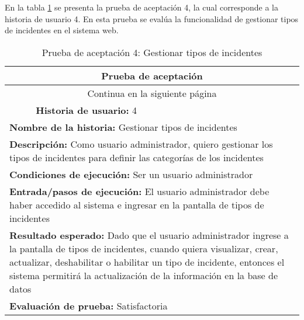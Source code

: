 En la tabla \ref{tab:prueba-4} se presenta la prueba de aceptación 4, la cual corresponde a la historia de usuario 4.
En esta prueba se evalúa la funcionalidad de gestionar tipos de incidentes en el sistema web.

\begin{longtable}{|p{6.7cm}|p{6.7cm}|}
    \caption{Prueba de aceptación 4: Gestionar tipos de incidentes} \label{tab:prueba-4}
    \\
    \hline
    \multicolumn{2}{|c|}{\textbf{Prueba de aceptación}}                                                                                                                         \\
    \hline

    \endfirsthead

    \hline
    \endhead

    \hline
    \multicolumn{2}{|c|}{{Continua en la siguiente página}}                                                                                                                     \\
    \hline
    \endfoot

    \hline
    \endlastfoot
    \multicolumn{1}{|p{6.7cm}|}{\textbf{Número} 4 } & \multicolumn{1}{|p{6.7cm}|}{\textbf{Historia de usuario:} 4}                                                              \\
    \hline
    \multicolumn{2}{|p{13.4cm}|}{\textbf{Nombre de la historia:} Gestionar tipos de incidentes }                                                                                \\
    \hline
    \multicolumn{2}{|p{13.4cm}|}{\textbf{Descripción:} Como usuario administrador, quiero gestionar los tipos de incidentes para definir las categorías de los incidentes}      \\
    \hline
    \multicolumn{2}{|p{13.4cm}|}{\textbf{Condiciones de ejecución:} Ser un usuario administrador}                                                                               \\
    \hline
    \multicolumn{2}{|p{13.4cm}|}{\textbf{Entrada/pasos de ejecución:} El usuario administrador debe haber accedido al sistema e ingresar en la pantalla de tipos de incidentes} \\
    \hline
    \multicolumn{2}{|p{13.4cm}|}{\textbf{Resultado esperado:} Dado que el usuario administrador ingrese a la pantalla de tipos de incidentes, cuando quiera visualizar,
    crear, actualizar, deshabilitar o habilitar un tipo de incidente, entonces el sistema permitirá la actualización de la información en la base de datos}                     \\
    \hline
    \multicolumn{2}{|p{13.4cm}|}{\textbf{Evaluación de prueba:} Satisfactoria}                                                                                                  \\
    \hline
\end{longtable}

